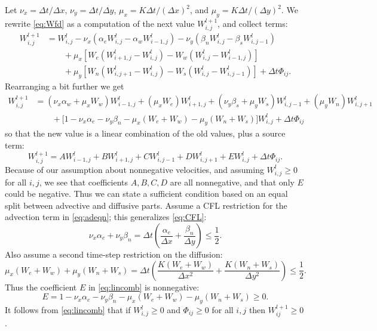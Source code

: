 \documentclass[11pt,final]{amsart}%
\newcommand{\Wlij}{W^l_{i,j}}
\begin{document}
Let $\nu_x = \Delta t/\Delta x$, $\nu_y = \Delta t/\Delta y$, $\mu_x = K \Delta t / (\Delta x)^2$, and $\mu_y = K \Delta t / (\Delta y)^2$.  We rewrite \eqref{eq:Wfd} as a computation of the next value $W_{i,j}^{l+1}$, and collect terms:
\begin{align*}
 W_{i,j}^{l+1} &= \Wlij - \nu_x \left(\alpha_e \Wlij - \alpha_w W_{i-1,j}^l\right) - \nu_y \left(\beta_n \Wlij - \beta_s W_{i,j-1}^l\right)  \\
      &\qquad + \mu_x \left[W_e \left(W_{i+1,j}^l - \Wlij\right) - W_w \left(\Wlij - W_{i-1,j}^l\right)\right]  \\
      &\qquad + \mu_y \left[W_n \left(W_{i,j+1}^l - \Wlij\right) - W_s \left(\Wlij - W_{i,j-1}^l\right)\right] + \Delta t \Phi_{ij}.
\end{align*}
Rearranging a bit further we get
\begin{align*}
 W_{i,j}^{l+1} &= (\nu_x \alpha_w + \mu_x W_w) W_{i-1,j}^l + (\mu_x W_e) W_{i+1,j}^l + (\nu_y \beta_s + \mu_y W_s) W_{i,j-1}^l + (\mu_y W_n) W_{i,j+1}^l \\
      &\qquad + \Big[1 - \nu_x \alpha_e - \nu_y \beta_n - \mu_x (W_e + W_w) - \mu_y (W_n + W_s)\Big] \Wlij + \Delta t \Phi_{ij}
\end{align*}
so that the new value is a linear combination of the old values, plus a source term:
\begin{equation}
W_{i,j}^{l+1} = A W_{i-1,j}^l + B W_{i+1,j}^l + C W_{i,j-1}^l + D W_{i,j+1}^l + E \Wlij + \Delta t \Phi_{ij}. \label{eq:lincomb}
\end{equation}
Because of our assumption about nonnegative velocities, and assuming $\Wlij \ge 0$ for all $i,j$, we see that coefficients $A,B,C,D$ are all nonnegative, and that only $E$ could be negative.  Thus we can state a sufficient condition based on an equal split between advective and diffusive parts.  Assume a CFL restriction for the advection term in \eqref{eq:adeqn}; this generalizes \eqref{eq:CFL}:
\begin{equation}
\nu_x \alpha_e + \nu_y \beta_n = \Delta t \left(\frac{\alpha_e}{\Delta x} + \frac{\beta_n}{\Delta y}\right) \le \frac{1}{2}. \label{eq:adstabcond}
\end{equation}
Also assume a second time-step restriction on the diffusion:
\begin{equation}
\mu_x (W_e + W_w) + \mu_y (W_n + W_s) = \Delta t \left(\frac{K(W_e + W_w)}{\Delta x^2} + \frac{K(W_n + W_s)}{\Delta y^2}\right) \le \frac{1}{2}. \label{eq:diffstabcond}
\end{equation}
Thus the coefficient $E$ in \eqref{eq:lincomb} is nonnegative:
	$$E = 1 - \nu_x \alpha_e - \nu_y \beta_n - \mu_x (W_e + W_w) - \mu_y (W_n + W_s) \ge 0.$$
It follows from \eqref{eq:lincomb} that if $\Wlij\ge 0$ and $\Phi_{ij}\ge 0$ for all $i,j$ then $W_{ij}^{l+1}\ge 0$.
\end{document}
